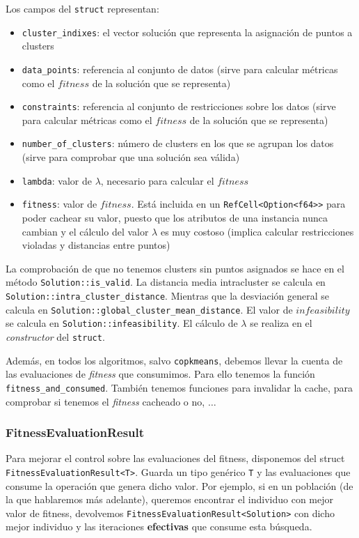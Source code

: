 \documentclass[11pt]{article}
\begin{document}
Los campos del \lstinline{struct} representan:

\begin{itemize}
\item \lstinline{cluster_indixes}: el vector solución que representa la asignación de puntos a clusters
\item \lstinline{data_points}: referencia al conjunto de datos (sirve para calcular métricas como el $fitness$ de la solución que se representa)
\item \lstinline{constraints}: referencia al conjunto de restricciones sobre los datos (sirve para calcular métricas como el $fitness$ de la solución que se representa)
\item \lstinline{number_of_clusters}: número de clusters en los que se agrupan los datos (sirve para comprobar que una solución sea válida)
\item \lstinline{lambda}: valor de $\lambda$, necesario para calcular el $fitness$
\item \lstinline{fitness}: valor de $fitness$. Está incluida en un \lstinline{RefCell<Option<f64>>} para poder cachear su valor, puesto que los atributos de una instancia nunca cambian y el cálculo del valor $\lambda$ es muy costoso (implica calcular restricciones violadas y distancias entre puntos)
\end{itemize}

La comprobación de que no tenemos clusters sin puntos asignados se hace en el método \lstinline{Solution::is_valid}. La distancia media intracluster se calcula en \lstinline{Solution::intra_cluster_distance}. Mientras que la desviación general se calcula en \lstinline{Solution::global_cluster_mean_distance}. El valor de $infeasibility$ se calcula en \lstinline{Solution::infeasibility}. El cálculo de $\lambda$ se realiza en el \emph{constructor} del \lstinline{struct}.

Además, en todos los algoritmos, salvo \lstinline{copkmeans}, debemos llevar la cuenta de las evaluaciones de \emph{fitness} que consumimos. Para ello tenemos la función \lstinline{fitness_and_consumed}. También tenemos funciones para invalidar la cache, para comprobar si tenemos el \emph{fitness} cacheado o no, $\ldots$

\subsubsection{FitnessEvaluationResult}

Para mejorar el control sobre las evaluaciones del fitness, disponemos del struct  \lstinline{FitnessEvaluationResult<T>}. Guarda un tipo genérico \lstinline{T} y las evaluaciones que consume la operación que genera dicho valor. Por ejemplo, si en un población (de la que hablaremos más adelante), queremos encontrar el individuo con mejor valor de fitness, devolvemos \lstinline{FitnessEvaluationResult<Solution>} con dicho mejor individuo y las iteraciones \textbf{efectivas} que consume esta búsqueda.
\end{document}
